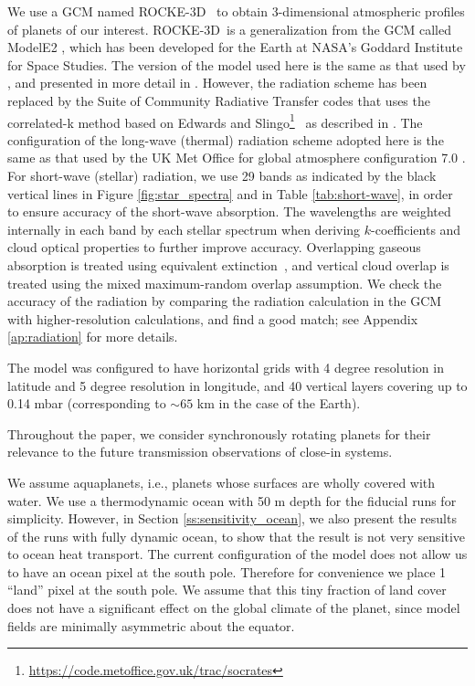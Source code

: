 \documentclass[11pt,numberedappendix,twocolappendix,]{emulateapj}
\def\modelE{ROCKE-3D}
\begin{document}
We use a GCM named \modelE \ \citep{Way2017} to obtain 3-dimensional atmospheric profiles of planets of our interest. 
\modelE \ is a generalization from the GCM called ModelE2 \citep{Schmidt2014}, which has been developed for the Earth at NASA's Goddard Institute for Space Studies. 
%
The version of the model used here is the same as that used by \citet{Way2016}, and presented in more detail in \citet{Way2017}.
However, the radiation scheme has been replaced by the Suite of Community Radiative Transfer codes that uses the correlated-k method based on Edwards and Slingo\footnote{\url{https://code.metoffice.gov.uk/trac/socrates}}~\citep[SOCRATES,][]{EdwardsSlingo1996,Edwards1996} as described in \citet{Way2017}. 
The configuration of the long-wave (thermal) radiation scheme adopted here is the same as that used by the UK Met Office for global atmosphere configuration 7.0 \citep[GA7.0;][]{Walters2017}. 
For short-wave (stellar) radiation, we use 29 bands as indicated by the black vertical lines in Figure \ref{fig:star_spectra} and in Table \ref{tab:short-wave}, in order to ensure accuracy of the short-wave absorption. 
The wavelengths are weighted internally in each band by each stellar spectrum when deriving $k$-coefficients and cloud optical properties to further improve accuracy. 
Overlapping gaseous absorption is treated using equivalent extinction~\citep{Edwards1996,Amundsen2016}, and vertical cloud overlap is treated using the mixed maximum-random overlap assumption. 
We check the accuracy of the radiation by comparing the radiation calculation in the GCM with higher-resolution calculations, and find a good match;  see Appendix \ref{ap:radiation} for more details. 

The model was configured to have horizontal grids with 4 degree resolution in latitude and 5 degree resolution in longitude, and 40 vertical layers covering up to 0.14 mbar (corresponding to $\sim 65$ km in the case of the Earth). 

Throughout the paper, we consider synchronously rotating planets for their  relevance to the future transmission observations of close-in systems. 

We assume aquaplanets, i.e., planets whose surfaces are wholly covered with water. 
We use a thermodynamic ocean with 50 m depth for the fiducial runs for simplicity. 
However, in Section \ref{ss:sensitivity_ocean}, we also present the results of the runs with fully dynamic ocean, to show that the result is not very sensitive to ocean heat transport. 
The current configuration of the model does not allow us to have an ocean pixel at the south pole. Therefore for convenience we place 1 ``land'' pixel at the south pole. We assume that this tiny fraction of land cover does not have a significant effect on the global climate of the planet, since model fields are minimally asymmetric about the equator. 
\end{document}
